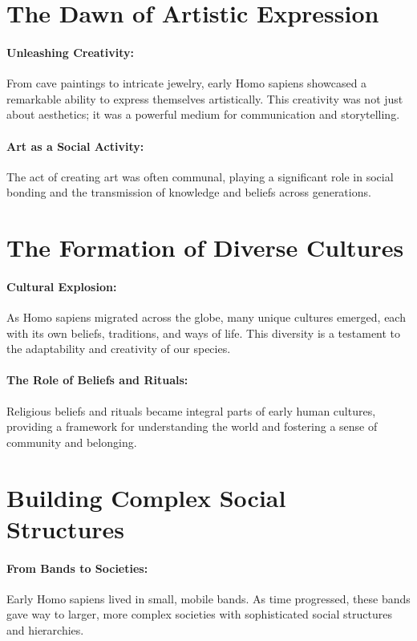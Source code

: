 \documentclass[a4paper,12pt]{book}
\begin{document}
\section*{The Dawn of Artistic Expression}

\paragraph{Unleashing Creativity:}
From cave paintings to intricate jewelry, early Homo sapiens showcased a remarkable ability to express themselves artistically. This creativity was not just about aesthetics; it was a powerful medium for communication and storytelling.

\paragraph{Art as a Social Activity:}
The act of creating art was often communal, playing a significant role in social bonding and the transmission of knowledge and beliefs across generations.

\section*{The Formation of Diverse Cultures}

\paragraph{Cultural Explosion:}
As Homo sapiens migrated across the globe, many unique cultures emerged, each with its own beliefs, traditions, and ways of life. This diversity is a testament to the adaptability and creativity of our species.

\paragraph{The Role of Beliefs and Rituals:}
Religious beliefs and rituals became integral parts of early human cultures, providing a framework for understanding the world and fostering a sense of community and belonging.

\section*{Building Complex Social Structures}

\paragraph{From Bands to Societies:}
Early Homo sapiens lived in small, mobile bands. As time progressed, these bands gave way to larger, more complex societies with sophisticated social structures and hierarchies.
\end{document}
